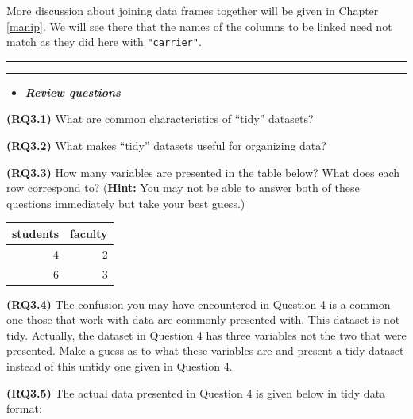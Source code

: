 \documentclass[]{tufte-book}
\let\oldrule=\rule
\renewcommand{\rule}[1]{\oldrule{\linewidth}}
\newenvironment{rmdblock}[1]
  {\begin{shaded*}
  \begin{itemize}
  \renewcommand{\labelitemi}{
    \raisebox{-.7\height}[0pt][0pt]{
    }
  }
  \item
  }
  {
  \end{itemize}
  \end{shaded*}
  }
\newenvironment{review}
  {\begin{rmdblock}{warning}}
  {\end{rmdblock}}
\begin{document}
More discussion about joining data frames together will be given in
Chapter \ref{manip}. We will see there that the names of the columns to
be linked need not match as they did here with \texttt{"carrier"}.

\begin{center}\rule{0.5\linewidth}{\linethickness}\end{center}

\begin{center}\rule{0.5\linewidth}{\linethickness}\end{center}

\begin{review}
\textbf{\emph{Review questions}}
\end{review}

\textbf{(RQ3.1)} What are common characteristics of ``tidy'' datasets?

\textbf{(RQ3.2)} What makes ``tidy'' datasets useful for organizing
data?

\textbf{(RQ3.3)} How many variables are presented in the table below?
What does each row correspond to? (\textbf{Hint:} You may not be able to
answer both of these questions immediately but take your best guess.)

\begin{tabular}{r|r}
\hline
students & faculty\\
\hline
4 & 2\\
\hline
6 & 3\\
\hline
\end{tabular}

\textbf{(RQ3.4)} The confusion you may have encountered in Question 4 is
a common one those that work with data are commonly presented with. This
dataset is not tidy. Actually, the dataset in Question 4 has three
variables not the two that were presented. Make a guess as to what these
variables are and present a tidy dataset instead of this untidy one
given in Question 4.

\textbf{(RQ3.5)} The actual data presented in Question 4 is given below
in tidy data format:
\end{document}

